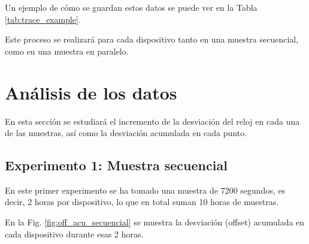 Un ejemplo de cómo se guardan estos datos se puede ver en la Tabla \ref{tab:trace_example}.
\begin{table}[htpb!]
    \centering
    \caption{Ejemplo de los datos obtenidos de cada dispositivo}
    \label{tab:trace_example}
\end{table}

Este proceso se realizará para cada dispositivo tanto en una muestra secuencial, como en una muestra en paralelo. 


\section{Análisis de los datos}

En esta sección se estudiará el incremento de la desviación del reloj en cada una de las muestras, así como la desviación acumulada en cada punto.

\subsection{Experimento 1: Muestra secuencial}

En este primer experimento se ha tomado una muestra de \SI{7200}{} segundos, es decir, \SI{2}{} horas por dispositivo, lo que en total suman \SI{10}{} horas de muestras.

En la Fig. \ref{fig:off_acu_secuencial} se muestra la desviación (offset) acumulada en cada dispositivo durante esas \SI{2}{} horas.


